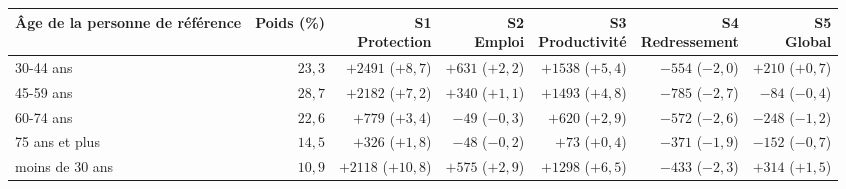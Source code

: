 \begin{tabular}{p{4.2cm}rrrrrr}\toprule Âge de la personne de référence & Poids (\%) & \makecell{S1\\Protection} & \makecell{S2\\Emploi} & \makecell{S3\\Productivité} & \makecell{S4\\Redressement} & \makecell{S5\\Global}\\ \midrule
30-44 ans & $23{,}3$ & $+2491$ ($+8{,}7$) & $+631$ ($+2{,}2$) & $+1538$ ($+5{,}4$) & $-554$ ($-2{,}0$) & $+210$ ($+0{,}7$)\\
45-59 ans & $28{,}7$ & $+2182$ ($+7{,}2$) & $+340$ ($+1{,}1$) & $+1493$ ($+4{,}8$) & $-785$ ($-2{,}7$) & $-84$ ($-0{,}4$)\\
60-74 ans & $22{,}6$ & $+779$ ($+3{,}4$) & $-49$ ($-0{,}3$) & $+620$ ($+2{,}9$) & $-572$ ($-2{,}6$) & $-248$ ($-1{,}2$)\\
75 ans et plus & $14{,}5$ & $+326$ ($+1{,}8$) & $-48$ ($-0{,}2$) & $+73$ ($+0{,}4$) & $-371$ ($-1{,}9$) & $-152$ ($-0{,}7$)\\
moins de 30 ans & $10{,}9$ & $+2118$ ($+10{,}8$) & $+575$ ($+2{,}9$) & $+1298$ ($+6{,}5$) & $-433$ ($-2{,}3$) & $+314$ ($+1{,}5$)\\\bottomrule\end{tabular}